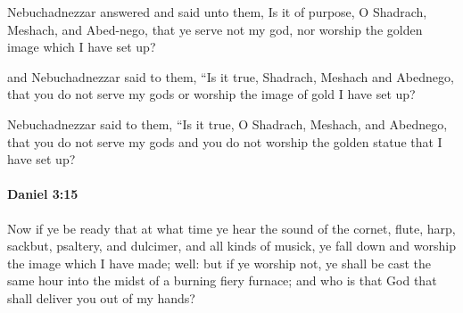 			\begin{versebox}
					\item[BHS] 
					\item[LXX] 
					\item[ASV] Nebuchadnezzar answered and said unto them, Is it of purpose, O Shadrach, Meshach, and Abed-nego, that ye serve not my god, nor worship the golden image which I have set up?
					\item[NIV] and Nebuchadnezzar said to them, “Is it true, Shadrach, Meshach and Abednego, that you do not serve my gods or worship the image of gold I have set up?
					\item[NRSV] Nebuchadnezzar said to them, “Is it true, O Shadrach, Meshach, and Abednego, that you do not serve my gods and you do not worship the golden statue that I have set up?
			\end{versebox}

		\paragraph{Daniel 3:15} %
			\label{DANIEL-3-15}

			Now if ye be ready that at what time ye hear the sound of the cornet, flute, harp, sackbut, psaltery, and dulcimer, and all kinds of musick, ye fall down and worship the image which I have made; well: but if ye worship not, ye shall be cast the same hour into the midst of a burning fiery furnace; and who is that God that shall deliver you out of my hands?

